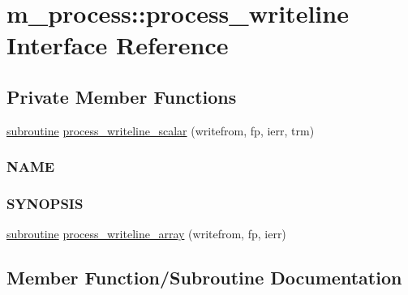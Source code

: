 \hypertarget{interfacem__process_1_1process__writeline}{}\section{m\+\_\+process\+:\+:process\+\_\+writeline Interface Reference}
\label{interfacem__process_1_1process__writeline}
\subsection*{Private Member Functions}
\begin{DoxyCompactItemize}
\item 
\hyperlink{M__stopwatch_83_8txt_acfbcff50169d691ff02d4a123ed70482}{subroutine} \hyperlink{interfacem__process_1_1process__writeline_a9e95166556bec54fd10568f01d02f34e}{process\+\_\+writeline\+\_\+scalar} (writefrom, fp, ierr, trm)
\begin{DoxyCompactList}\small\item\em \subsubsection*{N\+A\+ME}

\subsubsection*{S\+Y\+N\+O\+P\+S\+IS}\end{DoxyCompactList}\item 
\hyperlink{M__stopwatch_83_8txt_acfbcff50169d691ff02d4a123ed70482}{subroutine} \hyperlink{interfacem__process_1_1process__writeline_aa3543e9b23056b2f35869003f777f65d}{process\+\_\+writeline\+\_\+array} (writefrom, fp, ierr)
\end{DoxyCompactItemize}


\subsection{Member Function/\+Subroutine Documentation}
\mbox{\label{interfacem__process_1_1process__writeline_aa3543e9b23056b2f35869003f777f65d}} 
